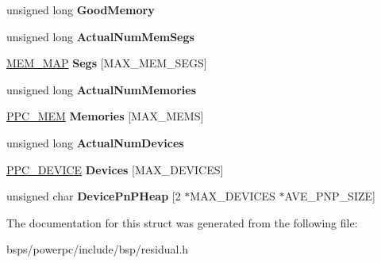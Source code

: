 \begin{DoxyCompactItemize}
\item 
\mbox{\label{struct__RESIDUAL_a9193b5079ca6f7f4e3ea5eb6eb31d760}} 
unsigned long {\bfseries Good\+Memory}
\item 
\mbox{\label{struct__RESIDUAL_a246db69620f8bb21b319939ae2d24c88}} 
unsigned long {\bfseries Actual\+Num\+Mem\+Segs}
\item 
\mbox{\label{struct__RESIDUAL_aa1e13b719d69ce904741d8dee432c50c}} 
\mbox{\hyperlink{struct__MEM__MAP}{M\+E\+M\+\_\+\+M\+AP}} {\bfseries Segs} \mbox{[}M\+A\+X\+\_\+\+M\+E\+M\+\_\+\+S\+E\+GS\mbox{]}
\item 
\mbox{\label{struct__RESIDUAL_abc07b5f2e47c0060074db4d6ae7f88b4}} 
unsigned long {\bfseries Actual\+Num\+Memories}
\item 
\mbox{\label{struct__RESIDUAL_afb4dd0b1335914fb7603e86c6e1650be}} 
\mbox{\hyperlink{struct__PPC__MEM}{P\+P\+C\+\_\+\+M\+EM}} {\bfseries Memories} \mbox{[}M\+A\+X\+\_\+\+M\+E\+MS\mbox{]}
\item 
\mbox{\label{struct__RESIDUAL_a08303a8385b0cfbd07e037b565a04e5f}} 
unsigned long {\bfseries Actual\+Num\+Devices}
\item 
\mbox{\label{struct__RESIDUAL_ac1c18d25b80069ab2c8c4a662f8c4b6f}} 
\mbox{\hyperlink{struct__PPC__DEVICE}{P\+P\+C\+\_\+\+D\+E\+V\+I\+CE}} {\bfseries Devices} \mbox{[}M\+A\+X\+\_\+\+D\+E\+V\+I\+C\+ES\mbox{]}
\item 
\mbox{\label{struct__RESIDUAL_a8a8d71340f7336a428c72941ba6c5688}} 
unsigned char {\bfseries Device\+Pn\+P\+Heap} \mbox{[}2 $\ast$M\+A\+X\+\_\+\+D\+E\+V\+I\+C\+ES $\ast$A\+V\+E\+\_\+\+P\+N\+P\+\_\+\+S\+I\+ZE\mbox{]}
\end{DoxyCompactItemize}


The documentation for this struct was generated from the following file\+:\begin{DoxyCompactItemize}
\item 
bsps/powerpc/include/bsp/residual.\+h\end{DoxyCompactItemize}
